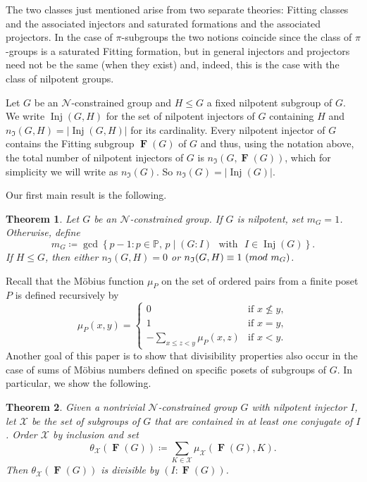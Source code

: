 \documentclass[10pt,a4paper]{amsart}
\numberwithin{equation}{section}
\DeclareMathOperator{\fitt}{\mathbf{F}}
\DeclareMathOperator{\inj}{Inj}
\newcommand{\card}[1]{\left\lvert{#1}\right\rvert}
\renewcommand{\leq}{\leqslant}
\newcommand{\md}[1]{\,\left(\textnormal{mod}\ #1\right)}
\newtheorem{prevtheorem}{Theorem}
\begin{document}
The two classes just mentioned arise from two separate theories:
Fitting classes and the associated injectors and saturated formations
and the associated projectors. 
In the case of $\pi$-subgroups the two notions coincide since the
class of $\pi$-groups is a saturated Fitting formation,
but in general injectors and projectors need not be the same (when they exist) and, indeed, this is the case
with the class of nilpotent groups.

Let $G$ be an $\mathcal{N}$-constrained group  and  $H\leq G$  a fixed nilpotent subgroup of $G$. We write $\inj(G,H)$ for the set of nilpotent injectors of $G$ containing $H$ and  $n_\mathfrak{I}(G,H) = \card{\inj(G, H)}$  for its cardinality.
Every nilpotent injector of $G$ contains the Fitting subgroup $\fitt(G)$ of $G$ and thus, using the notation above,  the total number of nilpotent injectors of $G$ is $n_\mathfrak{I}(G, \fitt(G))$, which  for simplicity we will write  as  $n_\mathfrak{I}(G)$. So   $n_\mathfrak{I}(G) = \card{\inj(G)}$.

Our first main result is the following.

\begin{prevtheorem} \label{Thm:A}
Let $G$ be an ${\mathcal N}$-constrained group. If $G$ is nilpotent, set $m_G=1$.  Otherwise, define
\begin{equation}
m_G \coloneqq \gcd\left\{ p - 1 : p\in\mathbb{P},\, p \mid (G : I) \,\,\text{ with }\,\, I \in \inj(G) \right\}.
\end{equation}
If $H \leq G$, then either $n_\mathfrak{I}(G,H)=0$ or $n_\mathfrak{I}(G,H) \equiv 1\md{m_G}$.
\end{prevtheorem}


Recall that the M\"obius function $\mu_P$ on the set of ordered pairs from a finite poset $P$ is defined recursively by
\[
\mu_P(x,y)= \left\{ \begin{array}{lll} 
0                            & \mbox{if } x \not \leq y,\\ 
1                            & \mbox{if } x = y,        \\ 
-\sum_{x \leq z<y}\mu_P(x,z) & \mbox{if } x < y .
\end{array} \right.
\]
Another goal of this paper is to show that divisibility properties also occur in the case of sums of M\"obius numbers defined on specific posets of subgroups of $G$.  In particular, we show the following.

\begin{prevtheorem}\label{Thm:B}
Given a nontrivial ${\mathcal N}$-constrained group $G$ with nilpotent injector $I$, 
let $\mathcal{X}$ be the set of subgroups of $G$ that are contained in at least one conjugate of $I$.  
Order $\mathcal{X}$ by inclusion and set
\[
\theta_\mathcal{X}(\fitt(G)) \coloneqq
\sum_{K \in \mathcal{X}}\mu_\mathcal{X}(\fitt(G),K).
\]
Then $\theta_\mathcal{X}(\fitt(G))$ is divisible by $(I : \fitt(G))$.
\end{prevtheorem}
\end{document}
